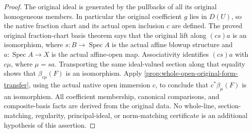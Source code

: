\begin{proof}
The original ideal is generated by the pullbacks of all its original
homogeneous members. In particular the original coefficient $g$ lies in $D(U)$,
so the native fraction chart and its actual open inclusion $c$ are defined.
The proved original fraction-chart basis theorem says that the
original lift along $(cs)a$ is an isomorphism, where $s:B\to\operatorname{Spec}A$
is the actual affine blowup structure and $a:\operatorname{Spec}A\to X$ is the
actual affine-open map. Associativity identifies $(cs)a$ with $c\mu$, where
$\mu=sa$. Transporting the same ideal-valued section along that equality shows
that $\beta_{c\mu}(F)$ is an isomorphism. Apply
\ref{prop:whole-open-original-form-transfer}, using the actual native open
immersion $c$, to conclude that $c^*\beta_\mu(F)$ is an isomorphism.
All coefficient membership, canonical comparisons, and composite-basis facts
are derived from the original data. No whole-line, section-matching,
regularity, principal-ideal, or norm-matching certificate is an additional
hypothesis of this assertion.
\end{proof}
